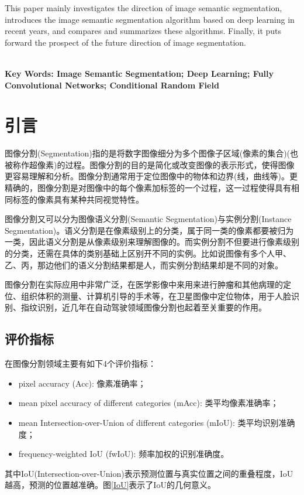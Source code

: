 \documentclass[cn]{elegantbook}
\begin{document}
This paper mainly investigates the direction of image semantic segmentation, introduces the image semantic segmentation algorithm based on deep learning in recent years, and compares and summarizes these algorithms. Finally, it puts forward the prospect of the future direction of image segmentation.

~\\

\noindent\textbf{Key Words: Image Semantic Segmentation; Deep Learning; Fully Convolutional Networks; Conditional Random Field}

\chapter{引言}
图像分割(Segmentation)指的是将数字图像细分为多个图像子区域(像素的集合)(也被称作超像素)的过程。图像分割的目的是简化或改变图像的表示形式，使得图像更容易理解和分析。图像分割通常用于定位图像中的物体和边界(线，曲线等)。更精确的，图像分割是对图像中的每个像素加标签的一个过程，这一过程使得具有相同标签的像素具有某种共同视觉特性。

图像分割又可以分为图像语义分割(Semantic Segmentation)与实例分割(Instance Segmentation)。语义分割是在像素级别上的分类，属于同一类的像素都要被归为一类，因此语义分割是从像素级别来理解图像的。而实例分割不但要进行像素级别的分类，还需在具体的类别基础上区别开不同的实例。比如说图像有多个人甲、乙、丙，那边他们的语义分割结果都是人，而实例分割结果却是不同的对象。

图像分割在实际应用中非常广泛，在医学影像中来用来进行肿瘤和其他病理的定位、组织体积的测量、计算机引导的手术等，在卫星图像中定位物体，用于人脸识别、指纹识别，近几年在自动驾驶领域图像分割也起着至关重要的作用。

\section{评价指标}
在图像分割领域主要有如下4个评价指标：
\begin{itemize}
	\item pixel accuracy (Acc): 像素准确率；
	\item mean pixel accuracy of different categories (mAcc): 类平均像素准确率；
	\item mean Intersection-over-Union of different categories (mIoU): 类平均识别准确度；
	\item frequency-weighted IoU (fwIoU): 频率加权的识别准确度。
\end{itemize}

其中IoU(Intersection-over-Union)表示预测位置与真实位置之间的重叠程度，IoU越高，预测的位置越准确。图\ref{IoU}表示了IoU的几何意义。
\end{document}
